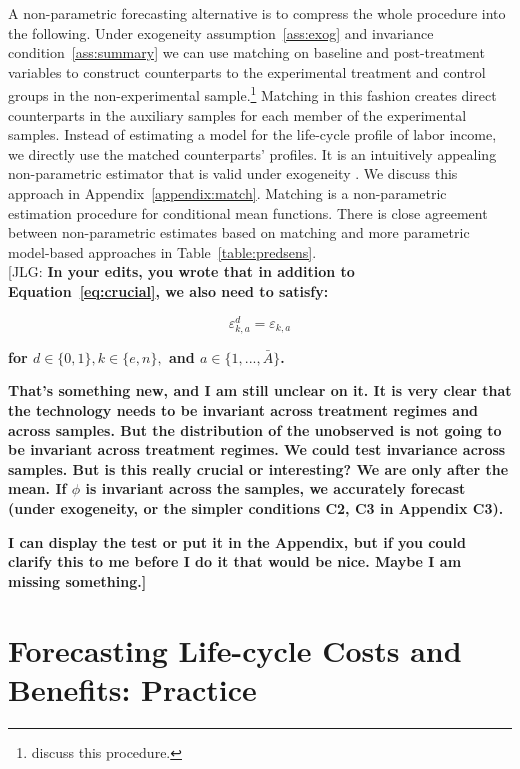 A non-parametric forecasting alternative is to compress the whole procedure into the following. Under exogeneity assumption~\ref{ass:exog} and invariance condition~\ref{ass:summary} we can use matching on baseline and post-treatment variables to construct counterparts to the experimental treatment and control groups in the non-experimental sample.\footnote{\citet{Heckman_Ichimura_etal_1998_Econometrica} discuss this procedure.} Matching in this fashion creates direct counterparts in the auxiliary samples for each member of the experimental samples. Instead of estimating a model for the life-cycle profile of labor income, we directly use the matched counterparts' profiles. It is an intuitively appealing non-parametric estimator that is valid under exogeneity \citep{Heckman_Navarro_2004_REStat}. We discuss this approach in Appendix~\ref{appendix:match}. Matching is a non-parametric estimation procedure for conditional mean functions. There is close agreement between non-parametric estimates based on matching and more parametric model-based approaches in Table~\ref{table:predsens}.\\ 

\noindent [JLG: \textbf{In your edits, you wrote that in addition to Equation~\eqref{eq:crucial}, we also need to satisfy:} 

\begin{equation}
\varepsilon_{k,a}^d = \varepsilon_{k,a}
\end{equation}

\noindent \textbf{for $d \in \{0, 1 \}, k \in \{e, n\},$ and $a \in \{1,..., \bar{A} \}$.} 

\textbf{That's something new, and I am still unclear on it. It is very clear that the technology needs to be invariant across treatment regimes and across samples. But the distribution of the unobserved is not going to be invariant across treatment regimes. We could test invariance across samples. But is this really crucial or interesting? We are only after the mean. If $\phi$ is invariant across the samples, we accurately forecast (under exogeneity, or the simpler conditions C2, C3 in Appendix C3).}

\noindent \textbf{I can display the test or put it in the Appendix, but if you could clarify this to me before I do it that would be nice. Maybe I am missing something.]}


\section{Forecasting Life-cycle Costs and Benefits: Practice} \label{section:cbapractice}

